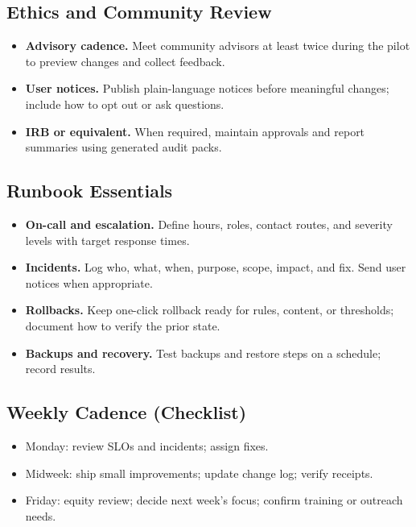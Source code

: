\documentclass[12pt]{article}
\begin{document}
\subsection*{Ethics and Community Review}
\begin{itemize}[leftmargin=*]
  \item \textbf{Advisory cadence.} Meet community advisors at least twice during the pilot to preview changes and collect feedback.
  \item \textbf{User notices.} Publish plain-language notices before meaningful changes; include how to opt out or ask questions.
  \item \textbf{IRB or equivalent.} When required, maintain approvals and report summaries using generated audit packs.
\end{itemize}

\subsection*{Runbook Essentials}
\begin{itemize}[leftmargin=*]
  \item \textbf{On-call and escalation.} Define hours, roles, contact routes, and severity levels with target response times.
  \item \textbf{Incidents.} Log who, what, when, purpose, scope, impact, and fix. Send user notices when appropriate.
  \item \textbf{Rollbacks.} Keep one-click rollback ready for rules, content, or thresholds; document how to verify the prior state.
  \item \textbf{Backups and recovery.} Test backups and restore steps on a schedule; record results.
\end{itemize}

\subsection*{Weekly Cadence (Checklist)}
\begin{itemize}[leftmargin=*]
  \item Monday: review SLOs and incidents; assign fixes.
  \item Midweek: ship small improvements; update change log; verify receipts.
  \item Friday: equity review; decide next week’s focus; confirm training or outreach needs.
\end{itemize}
\end{document}
